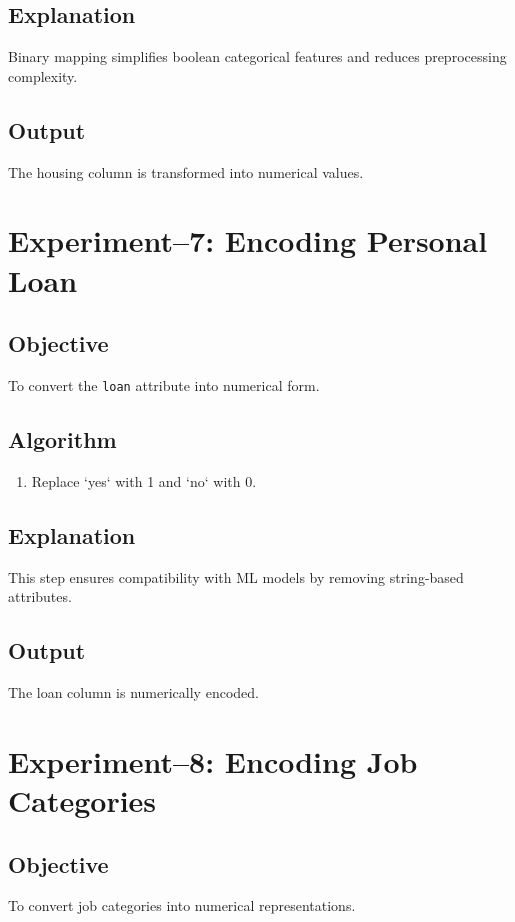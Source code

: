 \documentclass[11pt]{article}
\begin{document}
\subsection*{Explanation}
Binary mapping simplifies boolean categorical features and reduces preprocessing complexity.

\subsection*{Output}
The housing column is transformed into numerical values.

\section{Experiment--7: Encoding Personal Loan}

\subsection*{Objective}
To convert the \texttt{loan} attribute into numerical form.

\subsection*{Algorithm}
\begin{enumerate}
    \item Replace `yes` with 1 and `no` with 0.
\end{enumerate}

\subsection*{Explanation}
This step ensures compatibility with ML models by removing string-based attributes.

\subsection*{Output}
The loan column is numerically encoded.

\section{Experiment--8: Encoding Job Categories}

\subsection*{Objective}
To convert job categories into numerical representations.
\end{document}
